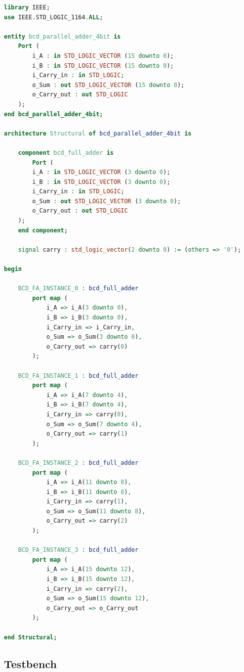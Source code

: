 \documentclass[12pt]{article}
\begin{document}
\begin{lstlisting}[language=VHDL]
library IEEE;
use IEEE.STD_LOGIC_1164.ALL;

entity bcd_parallel_adder_4bit is
    Port (
        i_A : in STD_LOGIC_VECTOR (15 downto 0);
        i_B : in STD_LOGIC_VECTOR (15 downto 0);
        i_Carry_in : in STD_LOGIC;
        o_Sum : out STD_LOGIC_VECTOR (15 downto 0);
        o_Carry_out : out STD_LOGIC
    );
end bcd_parallel_adder_4bit;

architecture Structural of bcd_parallel_adder_4bit is

    component bcd_full_adder is
        Port (
        i_A : in STD_LOGIC_VECTOR (3 downto 0);
        i_B : in STD_LOGIC_VECTOR (3 downto 0);
        i_Carry_in : in STD_LOGIC;
        o_Sum : out STD_LOGIC_VECTOR (3 downto 0);
        o_Carry_out : out STD_LOGIC
    );
    end component;

    signal carry : std_logic_vector(2 downto 0) := (others => '0');

begin

    BCD_FA_INSTANCE_0 : bcd_full_adder
        port map (
            i_A => i_A(3 downto 0),
            i_B => i_B(3 downto 0),
            i_Carry_in => i_Carry_in,
            o_Sum => o_Sum(3 downto 0),
            o_Carry_out => carry(0)
        );

    BCD_FA_INSTANCE_1 : bcd_full_adder
        port map (
            i_A => i_A(7 downto 4),
            i_B => i_B(7 downto 4),
            i_Carry_in => carry(0),
            o_Sum => o_Sum(7 downto 4),
            o_Carry_out => carry(1)
        );

    BCD_FA_INSTANCE_2 : bcd_full_adder
        port map (
            i_A => i_A(11 downto 8),
            i_B => i_B(11 downto 8),
            i_Carry_in => carry(1),
            o_Sum => o_Sum(11 downto 8),
            o_Carry_out => carry(2)
        );

    BCD_FA_INSTANCE_3 : bcd_full_adder
        port map (
            i_A => i_A(15 downto 12),
            i_B => i_B(15 downto 12),
            i_Carry_in => carry(2),
            o_Sum => o_Sum(15 downto 12),
            o_Carry_out => o_Carry_out
        );

end Structural;
\end{lstlisting}

\subsection*{Testbench}
\end{document}

